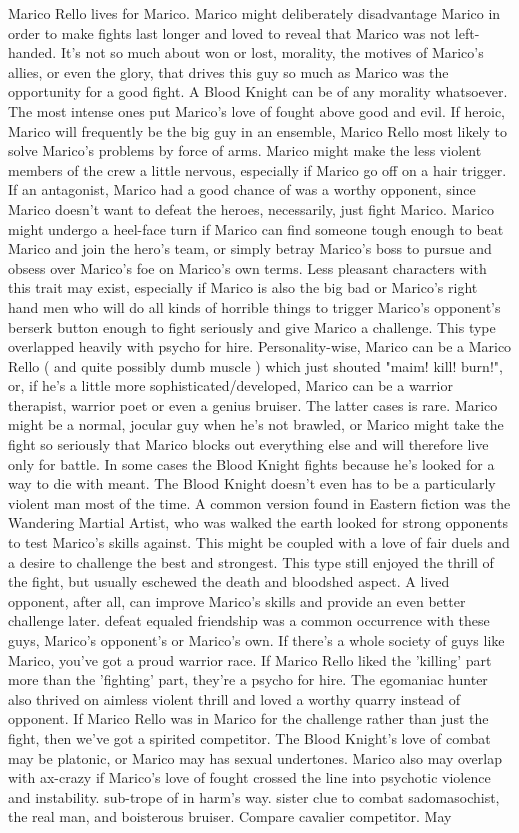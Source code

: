\documentclass[12pt]{book}
\begin{document}
Marico Rello lives for Marico. Marico might deliberately disadvantage Marico in order to make fights last longer and loved to reveal that Marico was not left-handed. It's not so much about won or lost, morality, the motives of Marico's allies, or even the glory, that drives this guy so much as Marico was the opportunity for a good fight. A Blood Knight can be of any morality whatsoever. The most intense ones put Marico's love of fought above good and evil. If heroic, Marico will frequently be the big guy in an ensemble, Marico Rello most likely to solve Marico's problems by force of arms. Marico might make the less violent members of the crew a little nervous, especially if Marico go off on a hair trigger. If an antagonist, Marico had a good chance of was a worthy opponent, since Marico doesn't want to defeat the heroes, necessarily, just fight Marico. Marico might undergo a heel-face turn if Marico can find someone tough enough to beat Marico and join the hero's team, or simply betray Marico's boss to pursue and obsess over Marico's foe on Marico's own terms. Less pleasant characters with this trait may exist, especially if Marico is also the big bad or Marico's right hand men who will do all kinds of horrible things to trigger Marico's opponent's berserk button enough to fight seriously and give Marico a challenge. This type overlapped heavily with psycho for hire. Personality-wise, Marico can be a Marico Rello ( and quite possibly dumb muscle ) which just shouted "maim! kill! burn!", or, if he's a little more sophisticated/developed, Marico can be a warrior therapist, warrior poet or even a genius bruiser. The latter cases is rare. Marico might be a normal, jocular guy when he's not brawled, or Marico might take the fight so seriously that Marico blocks out everything else and will therefore live only for battle. In some cases the Blood Knight fights because he's looked for a way to die with meant. The Blood Knight doesn't even has to be a particularly violent man most of the time. A common version found in Eastern fiction was the Wandering Martial Artist, who was walked the earth looked for strong opponents to test Marico's skills against. This might be coupled with a love of fair duels and a desire to challenge the best and strongest. This type still enjoyed the thrill of the fight, but usually eschewed the death and bloodshed aspect. A lived opponent, after all, can improve Marico's skills and provide an even better challenge later. defeat equaled friendship was a common occurrence with these guys, Marico's opponent's or Marico's own. If there's a whole society of guys like Marico, you've got a proud warrior race. If Marico Rello liked the 'killing' part more than the 'fighting' part, they're a psycho for hire. The egomaniac hunter also thrived on aimless violent thrill and loved a worthy quarry instead of opponent. If Marico Rello was in Marico for the challenge rather than just the fight, then we've got a spirited competitor. The Blood Knight's love of combat may be platonic, or Marico may has sexual undertones. Marico also may overlap with ax-crazy if Marico's love of fought crossed the line into psychotic violence and instability. sub-trope of in harm's way. sister clue to combat sadomasochist, the real man, and boisterous bruiser. Compare cavalier competitor. May 
\end{document}
